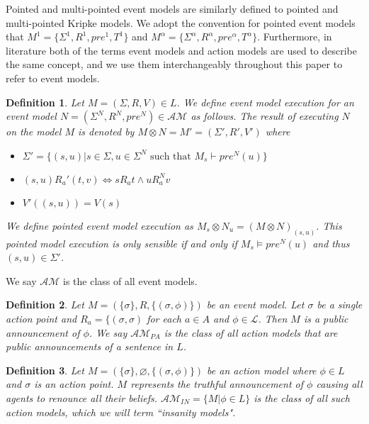 \documentclass[12pt, a4paper, titlepage]{scrartcl}
\newtheorem{defn}{Definition}[subsection]
\numberwithin{equation}{section}
\newcommand{\eventClass}{\mathcal{AM}}
\newcommand{\insaneClass}{\eventClass_{IN}}
\newcommand{\publicAnnClass}{\eventClass_{PA}}
\begin{document}
Pointed and multi-pointed event models are similarly defined to pointed and multi-pointed Kripke
models.
We adopt the convention for pointed event models that $M^1 = \{\Sigma^1, R^1,
pre^1, T^1\}$ and $M^\alpha = \{\Sigma^\alpha,R^\alpha,pre^\alpha,T^\alpha\}$.
Furthermore, in literature both of the terms event models and action models are used to describe
the same concept, and we use them interchangeably throughout this paper to refer to event models.

\begin{defn} \label{evModelEx}
Let $M = (\Sigma, R, V) \in L$. We define event model execution for an event model $N = (\Sigma^N,
		R^N, pre^N) \in
\mathcal{AM}$ as follows.
The result of executing $N$ on the model $M$ is denoted by $M \otimes N = M' = (\Sigma', R', V')$ where
\begin{itemize}
	\item $\Sigma' = \{(s,u) | s \in \Sigma, u \in \Sigma^N \text{ such that } M_s \vdash pre^N(u)\}$
	\item $(s, u) R_a' (t, v) \iff s R_a t \land u R_a^N v$
	\item $V'((s,u)) = V(s)$
\end{itemize}
We define pointed event model execution as $M_s \otimes N_u = (M \otimes N)_{(s, u)}$.
This pointed model execution is only sensible if and only if $M_s \models pre^N(u)$ and thus $(s,u)
	\in \Sigma'$.
\end{defn}

We say $\eventClass$ is the class of all event models.

\begin{defn} \label{pub}
Let $M = (\{ \sigma \}, R, \{ (\sigma, \phi)\})$ be an event model.
Let $\sigma$ be a single action point and $R_a = \{(\sigma, \sigma)$ for each $a \in A$ and $\phi
\in \mathcal{L}$.
Then $M$ is a public announcement of $\phi$.
We say $\publicAnnClass$ is the class of all action models that
are public announcements of a sentence in $L$.
\end{defn}

\begin{defn} \label{insanity}
Let $M = (\{ \sigma \}, \varnothing, \{(\sigma, \phi)\}) $ be an action model
where $\phi \in L$ and $\sigma$ is an action point.
$M$ represents the truthful announcement of $\phi$ causing all agents to renounce all their beliefs.
$\insaneClass = \{M | \phi \in L\}$ is the class of all such action models,
which we will term ``insanity models".
\end{defn}
\end{document}
